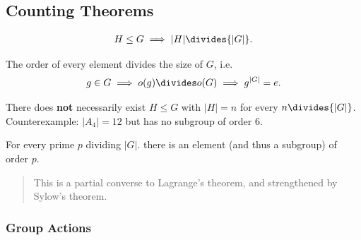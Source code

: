 \hypertarget{counting-theorems}{%
\subsection{Counting Theorems}\label{counting-theorems}}

\begin{theorem}

\begin{align*}H \leq G \implies {\left\lvert {H} \right\rvert} \divides {\left\lvert {G} \right\rvert}.\end{align*}

\end{theorem}

\begin{corollary}

The order of every element divides the size of \(G\), i.e.
\begin{align*}
  g\in G \implies o(g) \divides o(G) \implies g^{{\left\lvert {G} \right\rvert}} = e
  .\end{align*}

\end{corollary}

\begin{warnings}

There does \textbf{not} necessarily exist \(H \leq G\) with
\({\left\lvert {H} \right\rvert} = n\) for every
\(n \divides {\left\lvert {G} \right\rvert}\). Counterexample:
\({\left\lvert {A_4} \right\rvert} = 12\) but has no subgroup of order
6.

\end{warnings}

\begin{theorem}

For every prime \(p\) dividing \({\left\lvert {G} \right\rvert}\). there
is an element (and thus a subgroup) of order \(p\).

\begin{quote}
This is a partial converse to Lagrange's theorem, and strengthened by
Sylow's theorem.
\end{quote}

\end{theorem}

\hypertarget{group-actions}{%
\subsubsection{Group Actions}\label{group-actions}}

